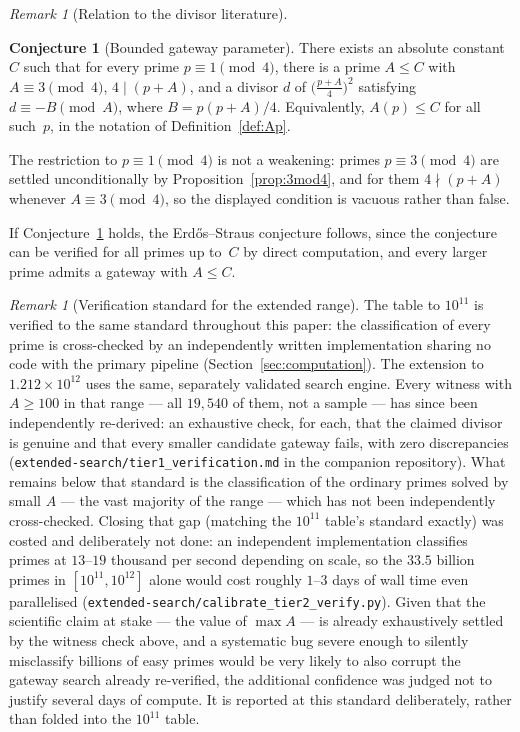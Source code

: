 \documentclass[12pt]{amsart}
\theoremstyle{definition}
\newtheorem{conjecture}[theorem]{Conjecture}
\theoremstyle{remark}
\newtheorem{remark}[theorem]{Remark}
\begin{document}
\begin{remark}[Relation to the divisor literature]
\begin{conjecture}[Bounded gateway parameter]\label{conj:bounded}
There exists an absolute constant~$C$ such that for every prime
$p \equiv 1 \pmod 4$,
there is a prime $A \leq C$ with $A \equiv 3 \pmod{4}$, $4 \mid (p+A)$,
and a divisor $d$ of $\bigl(\frac{p+A}{4}\bigr)^{\!2}$ satisfying
$d \equiv -B \pmod{A}$, where $B = p(p+A)/4$.
Equivalently, $A(p) \leq C$ for all such~$p$, in the notation of
Definition~\ref{def:Ap}.
\end{conjecture}

The restriction to $p \equiv 1 \pmod 4$ is not a weakening: primes
$p \equiv 3 \pmod 4$ are settled unconditionally by
Proposition~\ref{prop:3mod4}, and for them $4 \nmid (p+A)$ whenever
$A \equiv 3 \pmod 4$, so the displayed condition is vacuous rather than
false.

If Conjecture~\ref{conj:bounded} holds, the Erd\H{o}s--Straus conjecture
follows, since the conjecture can be verified for all primes up to~$C$
by direct computation, and every larger prime admits a gateway with $A \leq C$.

\begin{remark}[Verification standard for the extended range]\label{rem:verification-standard}
The table to $10^{11}$ is verified to the same standard throughout this
paper: the classification of every prime is cross-checked by an
independently written implementation sharing no code with the primary
pipeline (Section~\ref{sec:computation}). The extension to $1.212
\times 10^{12}$ uses the same, separately validated search engine.
Every witness with $A \geq 100$ in that range --- all $19{,}540$ of
them, not a sample --- has since been independently re-derived: an
exhaustive check, for each, that the claimed divisor is genuine and
that every smaller candidate gateway fails, with zero discrepancies
(\texttt{extended-search/tier1\_verification.md} in the companion
repository). What remains below that standard is the classification
of the ordinary primes solved by small $A$ --- the vast majority of
the range --- which has not been independently cross-checked. Closing
that gap (matching the $10^{11}$ table's standard exactly) was costed
and deliberately not done: an independent implementation classifies
primes at $13$--$19$ thousand per second depending on scale, so the
$33.5$ billion primes in $[10^{11}, 10^{12}]$ alone would cost
roughly $1$--$3$ days of wall time even parallelised
(\texttt{extended-search/calibrate\_tier2\_verify.py}). Given that the
scientific claim at stake --- the value of $\max A$ --- is already
exhaustively settled by the witness check above, and a systematic bug
severe enough to silently misclassify billions of easy primes would be
very likely to also corrupt the gateway search already re-verified,
the additional confidence was judged not to justify several days of
compute. It is reported at this standard deliberately, rather than
folded into the $10^{11}$ table.
\end{remark}


\end{remark}
\end{document}
